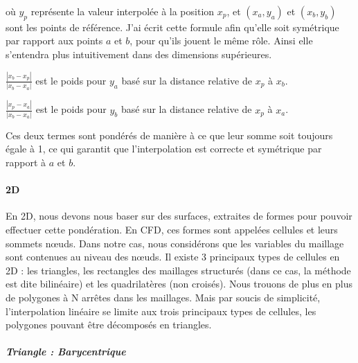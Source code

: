 où \( y_p \) représente la valeur interpolée à la position \( x_p \), et \((x_a, y_a)\) et \((x_b, y_b)\) sont les points de référence. J'ai écrit cette formule afin qu'elle soit symétrique par rapport aux points \( a \) et \( b \), pour qu'ils jouent le même rôle. Ainsi elle s'entendra plus intuitivement dans des dimensions supérieures.
\vspace{0.5cm}

        \( \frac{|x_b - x_p|}{|x_b - x_a|} \) est le poids pour \( y_a \) basé sur la distance relative de \( x_p \) à \( x_b \).

        \( \frac{|x_p - x_a|}{|x_b - x_a|} \) est le poids pour \( y_b \) basé sur la distance relative de \( x_p \) à \( x_a \).\vspace{0.5cm}

Ces deux termes sont pondérés de manière à ce que leur somme soit toujours égale à 1, ce
qui garantit que l'interpolation est correcte et symétrique par rapport à \( a \) et \( b \).\vspace{0.5cm}


\paragraph{2D}

\vspace{0.5cm}

En 2D, nous devons nous baser sur des surfaces, extraites de formes pour pouvoir effectuer cette pondération. En CFD, ces formes sont appelées cellules et leurs sommets nœuds. Dans notre cas, nous considérons que les variables du maillage sont contenues au niveau des nœuds. 
Il existe 3 principaux types de cellules en 2D : les triangles, les rectangles des maillages structurés (dans ce cas, la méthode est dite bilinéaire) et les quadrilatères (non croisés).
Nous trouons de plus en plus de polygones à N arrêtes dans les maillages. Mais par soucis de simplicité, l'interpolation linéaire se limite aux trois principaux types de cellules, les polygones pouvant être décomposés en triangles. %

\subparagraph{Triangle : Barycentrique}


